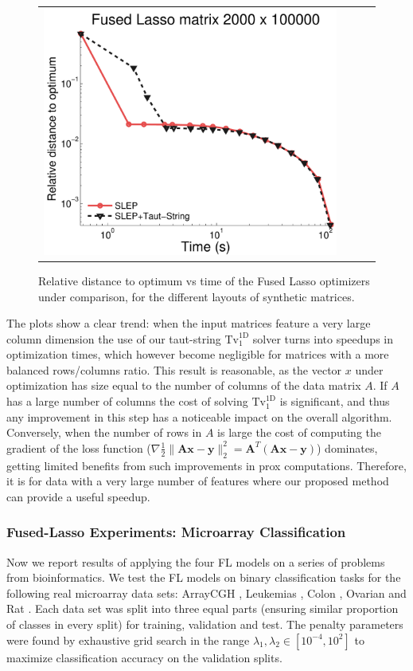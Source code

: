 \documentclass[twoside,11pt]{article}
\newcommand{\vx}{\bm{x}}       \newcommand{\vxh}{\hat{\bm{x}}}        \newcommand{\xh}{\hat{x}}    \newcommand{\vxt}{\tilde{\bm{x}}}       \newcommand{\xt}{\tilde{x}}
\newcommand{\vy}{\bm{y}}       \newcommand{\vyh}{\hat{\bm{y}}}        \newcommand{\yh}{\hat{y}}    \newcommand{\vyt}{\tilde{\bm{y}}}       \newcommand{\yt}{\tilde{y}}
\newcommand{\ma}{\bm{A}}
\newcommand{\mynorm}[2]{\| {#1} \|_{#2}}
\newcommand{\enorm}[1]{\mynorm{#1}{2}}
\newcommand{\half}{\tfrac{1}{2}}
\newcommand{\tvell}{\text{Tv}}
\newcommand{\oned}{\text{1D}}
\numberwithin{equation}{section}
\numberwithin{theorem}{section}
\begin{document}
\begin{figure}[]
\begin{tabular}{llll}
  \includegraphics[width=.37\linewidth]{BMFL-obj-2000x100000}&\hskip-12pt
  \end{tabular}
  \caption{Relative distance to optimum vs time of the Fused Lasso optimizers under comparison, for the different layouts of synthetic matrices.}
  \label{fig:FL-obj}
\end{figure}

The plots show a clear trend: when the input matrices feature a very large column dimension the use of our taut-string $\tvell_1^{\oned}$ solver turns into speedups in optimization times, which however become negligible for matrices with a more balanced rows/columns ratio. This result is reasonable, as the vector $x$ under optimization has size equal to the number of columns of the data matrix $A$. If $A$ has a large number of columns the cost of solving $\tvell_1^{\oned}$ is significant, and thus any improvement in this step has a noticeable impact on the overall algorithm. Conversely, when the number of rows in $A$ is large the cost of computing the gradient of the loss function ($\nabla \half \enorm{\ma \vx - \vy}^2 = \ma^T \left( \ma \vx - \vy \right)$) dominates, getting limited benefits from such improvements in prox computations. Therefore, it is for data with a very large number of features where our proposed method can provide a useful speedup.

\subsubsection{Fused-Lasso Experiments: Microarray Classification}
Now we report results of applying the four FL models on a series of problems from bioinformatics. We test the FL models on binary classification tasks for the following real microarray data sets: ArrayCGH \citep{Stransky06}, Leukemias \citep{Golub99}, Colon \citep{Alon99}, Ovarian \citep{RogersOvarian05} and Rat \citep{HuaFS09}. Each data set was split into three equal parts (ensuring similar proportion of classes in every split) for training, validation and test. The penalty parameters were found by exhaustive grid search in the range $\lambda_1, \lambda_2 \in [10^{-4},10^2]$ to maximize classification accuracy on the validation splits.
\end{document}
